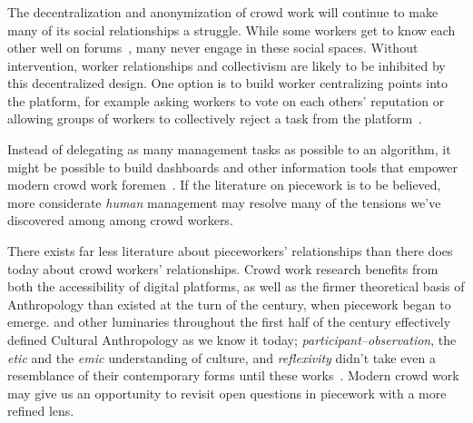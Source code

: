 \documentclass[trackingWork]{subfiles}
\begin{document}
\subsubsection{\implication}


The decentralization and anonymization of crowd work will continue to make many of its social relationships a struggle.
While some workers get to know each other well on forums~\cite{martin2014being,crowdcollab}, many never engage in these social spaces.
Without intervention, worker relationships and collectivism are likely to be inhibited by this decentralized design.
One option is to build worker centralizing points into the platform, for example asking workers to vote on each others' reputation or allowing groups of workers to collectively reject a task from the platform~\cite{crowdguilds}.

Instead of delegating as many management tasks as possible to an algorithm, it might be possible to build dashboards and other information tools that empower modern crowd work foremen~\cite{kulkarni2012mobileworks}.
If the literature on piecework is to be believed,
more considerate \textit{human} management may resolve
many of the tensions we've discovered among among crowd workers.

There exists far less literature about pieceworkers' relationships than there does today about crowd workers' relationships.
Crowd work research benefits from both the accessibility of digital platforms, as well as the firmer theoretical basis of Anthropology than
existed at the turn of the  century, when piecework began to emerge.
\citeauthor{malinowski2002argonauts,boas1940race,mead1973coming} and
other luminaries throughout the first half of the  century
effectively defined Cultural Anthropology as we know it today;
\textit{participant--observation},
the \textit{etic} and the \textit{emic} understanding of culture, and
\textit{reflexivity}
didn't take even a resemblance of their contemporary forms until these works~\cite{malinowski2002argonauts,boas1940race,mead1973coming}.
Modern crowd work may give us an opportunity to revisit open questions in piecework with a more refined lens.
\end{document}

